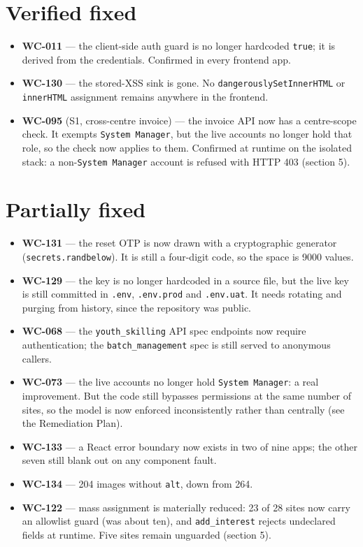 \documentclass[11pt]{article}
\newcommand{\wc}[1]{\mbox{WC-#1}}
\begin{document}
\section{Verified fixed}
\begin{itemize}
  \item \textbf{\wc{011}} --- the client-side auth guard is no longer hardcoded \texttt{true}; it is
        derived from the credentials. Confirmed in every frontend app.
  \item \textbf{\wc{130}} --- the stored-XSS sink is gone. No \texttt{dangerouslySetInnerHTML} or
        \texttt{innerHTML} assignment remains anywhere in the frontend.
  \item \textbf{\wc{095}} (S1, cross-centre invoice) --- the invoice API now has a centre-scope
        check. It exempts \texttt{System~Manager}, but the live accounts no longer hold that role, so
        the check now applies to them. Confirmed at runtime on the isolated stack: a
        non-\texttt{System~Manager} account is refused with HTTP 403 (section 5).
\end{itemize}

\section{Partially fixed}
\begin{itemize}
  \item \textbf{\wc{131}} --- the reset OTP is now drawn with a cryptographic generator
        (\texttt{secrets.randbelow}). It is still a four-digit code, so the space is 9000 values.
  \item \textbf{\wc{129}} --- the key is no longer hardcoded in a source file, but the live key is
        still committed in \texttt{.env}, \texttt{.env.prod} and \texttt{.env.uat}. It needs rotating
        and purging from history, since the repository was public.
  \item \textbf{\wc{068}} --- the \texttt{youth\_skilling} API spec endpoints now require
        authentication; the \texttt{batch\_management} spec is still served to anonymous callers.
  \item \textbf{\wc{073}} --- the live accounts no longer hold \texttt{System~Manager}: a real
        improvement. But the code still bypasses permissions at the same number of sites, so the
        model is now enforced inconsistently rather than centrally (see the Remediation Plan).
  \item \textbf{\wc{133}} --- a React error boundary now exists in two of nine apps; the other seven
        still blank out on any component fault.
  \item \textbf{\wc{134}} --- 204 images without \texttt{alt}, down from 264.
  \item \textbf{\wc{122}} --- mass assignment is materially reduced: 23 of 28 sites now carry an
        allowlist guard (was about ten), and \texttt{add\_interest} rejects undeclared fields at
        runtime. Five sites remain unguarded (section 5).
\end{itemize}
\end{document}
